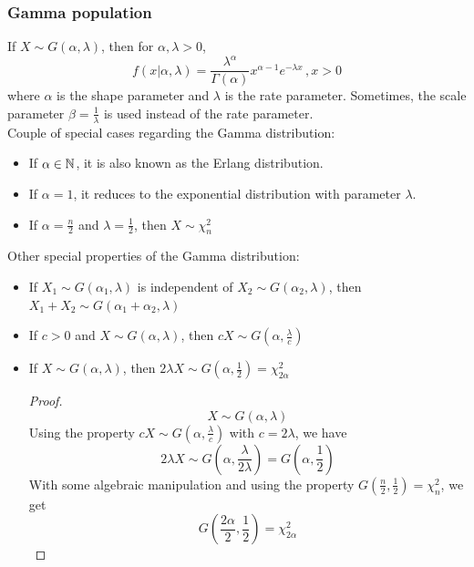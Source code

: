 \subsubsection{Gamma population}

If $X\sim G(\alpha,\lambda)$, then for $\alpha,\lambda>0$,
\begin{equation*}
    f(x|\alpha,\lambda) = \frac{\lambda^{\alpha}}{\Gamma(\alpha)} x^{\alpha - 1} e^{-\lambda x}\, ,x>0
\end{equation*}
where $\alpha$ is the shape parameter and $\lambda$ is the rate parameter. Sometimes, the scale parameter $\beta = \frac{1}{\lambda}$ is used instead of the rate parameter.\\

Couple of special cases regarding the Gamma distribution:
\begin{itemize}
    \item If $\alpha\in\mathbb{N}$, it is also known as the Erlang distribution.
    \item If $\alpha=1$, it reduces to the exponential distribution with parameter $\lambda$.
    \item If $\alpha=\frac{n}{2}$ and $\lambda=\frac{1}{2}$, then $X\sim \chi^2_{n}$
\end{itemize}
Other special properties of the Gamma distribution:
\begin{itemize}
    \item If $X_1\sim G(\alpha_1,\lambda)$ is independent of $X_2\sim G(\alpha_2,\lambda)$, then $X_1 + X_2 \sim G(\alpha_1 + \alpha_2, \lambda)$
    \item If $c>0$ and $X\sim G(\alpha,\lambda)$, then $cX\sim G(\alpha, \frac{\lambda}{c})$
    \item If $X\sim G(\alpha,\lambda)$, then $2\lambda X \sim G(\alpha, \frac{1}{2}) = \chi^2_{2\alpha}$
        \begin{proof}
            \begin{equation*}
                X\sim G(\alpha,\lambda)
            \end{equation*}
            Using the property $cX\sim G(\alpha, \frac{\lambda}{c})$ with $c = 2\lambda$, we have
            \begin{equation*}
                2\lambda X \sim G\left(\alpha, \frac{\lambda}{2\lambda}\right) = G\left(\alpha, \frac{1}{2}\right)
            \end{equation*}
            With some algebraic manipulation and using the property $G(\frac{n}{2},\frac{1}{2})=\chi^2_n$, we get
            \begin{equation*}
                G\left(\frac{2\alpha}{2}, \frac{1}{2}\right) = \chi^2_{2\alpha}
            \end{equation*}
        \end{proof}
\end{itemize}
